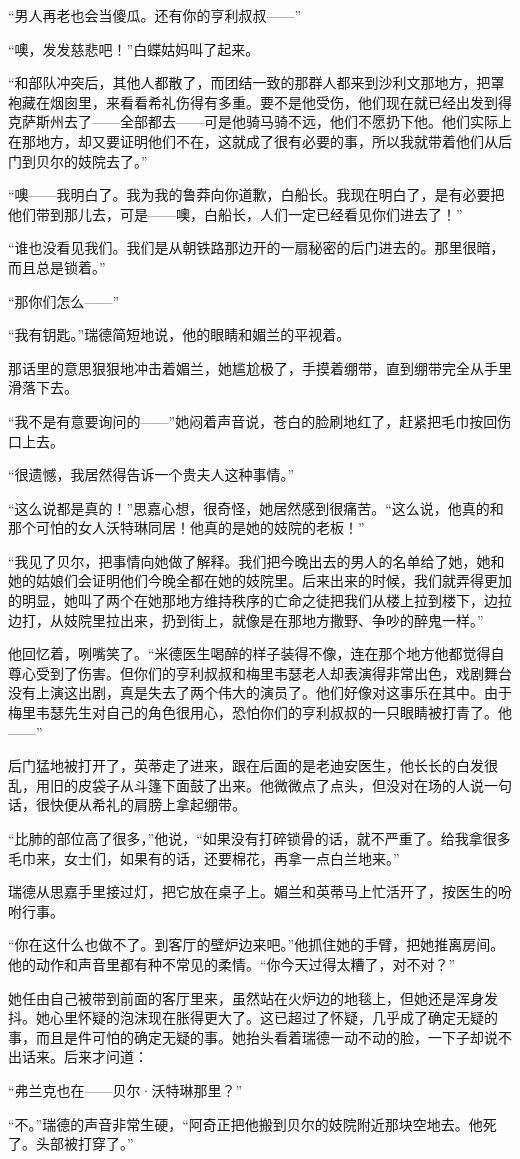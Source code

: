 \par “男人再老也会当傻瓜。还有你的亨利叔叔——”
\par “噢，发发慈悲吧！”白蝶姑妈叫了起来。
\par “和部队冲突后，其他人都散了，而团结一致的那群人都来到沙利文那地方，把罩袍藏在烟囱里，来看看希礼伤得有多重。要不是他受伤，他们现在就已经出发到得克萨斯州去了——全部都去——可是他骑马骑不远，他们不愿扔下他。他们实际上在那地方，却又要证明他们不在，这就成了很有必要的事，所以我就带着他们从后门到贝尔的妓院去了。”
\par “噢——我明白了。我为我的鲁莽向你道歉，白船长。我现在明白了，是有必要把他们带到那儿去，可是——噢，白船长，人们一定已经看见你们进去了！”
\par “谁也没看见我们。我们是从朝铁路那边开的一扇秘密的后门进去的。那里很暗，而且总是锁着。”
\par “那你们怎么——”
\par “我有钥匙。”瑞德简短地说，他的眼睛和媚兰的平视着。
\par 那话里的意思狠狠地冲击着媚兰，她尴尬极了，手摸着绷带，直到绷带完全从手里滑落下去。
\par “我不是有意要询问的——”她闷着声音说，苍白的脸刷地红了，赶紧把毛巾按回伤口上去。
\par “很遗憾，我居然得告诉一个贵夫人这种事情。”
\par “这么说都是真的！”思嘉心想，很奇怪，她居然感到很痛苦。“这么说，他真的和那个可怕的女人沃特琳同居！他真的是她的妓院的老板！”
\par “我见了贝尔，把事情向她做了解释。我们把今晚出去的男人的名单给了她，她和她的姑娘们会证明他们今晚全都在她的妓院里。后来出来的时候，我们就弄得更加的明显，她叫了两个在她那地方维持秩序的亡命之徒把我们从楼上拉到楼下，边拉边打，从妓院里拉出来，扔到街上，就像是在那地方撒野、争吵的醉鬼一样。”
\par 他回忆着，咧嘴笑了。“米德医生喝醉的样子装得不像，连在那个地方他都觉得自尊心受到了伤害。但你们的亨利叔叔和梅里韦瑟老人却表演得非常出色，戏剧舞台没有上演这出剧，真是失去了两个伟大的演员了。他们好像对这事乐在其中。由于梅里韦瑟先生对自己的角色很用心，恐怕你们的亨利叔叔的一只眼睛被打青了。他——”
\par 后门猛地被打开了，英蒂走了进来，跟在后面的是老迪安医生，他长长的白发很乱，用旧的皮袋子从斗篷下面鼓了出来。他微微点了点头，但没对在场的人说一句话，很快便从希礼的肩膀上拿起绷带。
\par “比肺的部位高了很多，”他说，“如果没有打碎锁骨的话，就不严重了。给我拿很多毛巾来，女士们，如果有的话，还要棉花，再拿一点白兰地来。”
\par 瑞德从思嘉手里接过灯，把它放在桌子上。媚兰和英蒂马上忙活开了，按医生的吩咐行事。
\par “你在这什么也做不了。到客厅的壁炉边来吧。”他抓住她的手臂，把她推离房间。他的动作和声音里都有种不常见的柔情。“你今天过得太糟了，对不对？”
\par 她任由自己被带到前面的客厅里来，虽然站在火炉边的地毯上，但她还是浑身发抖。她心里怀疑的泡沫现在胀得更大了。这已超过了怀疑，几乎成了确定无疑的事，而且是件可怕的确定无疑的事。她抬头看着瑞德一动不动的脸，一下子却说不出话来。后来才问道：
\par “弗兰克也在——贝尔·沃特琳那里？”
\par “不。”瑞德的声音非常生硬，“阿奇正把他搬到贝尔的妓院附近那块空地去。他死了。头部被打穿了。”

